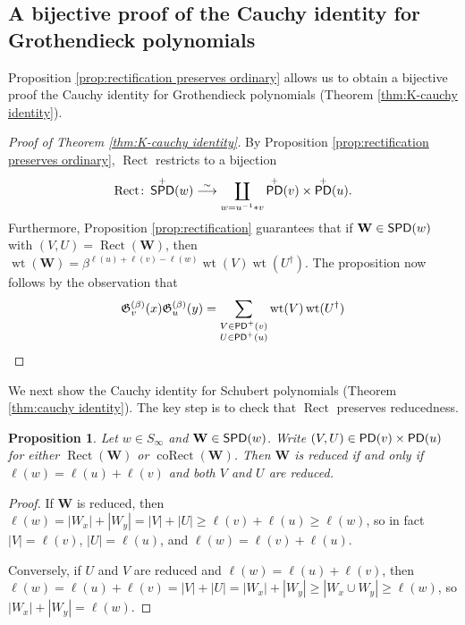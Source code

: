 \documentclass[11pt,reqno]{amsart} %
\newcommand{\frakG}{\mathfrak{G}}
\newcommand{\bfW}{\mathbf{W}}
\DeclareMathOperator{\wt}{wt}
\DeclareMathOperator{\PD}{\sf{PD}}
\DeclareMathOperator{\SPD}{\sf{SPD}}
\DeclareMathOperator{\Rect}{Rect} %
\DeclareMathOperator{\coRect}{coRect} %
\newtheorem{proposition}[theorem]{Proposition}
\theoremstyle{definition}
\begin{document}
\subsection{A bijective proof of the Cauchy identity for Grothendieck polynomials}
\label{subsect:cauchy identities}

Proposition \ref{prop:rectification preserves ordinary} allows us to obtain a bijective proof the Cauchy identity for Grothendieck polynomials (Theorem \ref{thm:K-cauchy identity}).

\begin{proof}[Proof of Theorem \ref{thm:K-cauchy identity}]
By Proposition \ref{prop:rectification preserves ordinary}, $\Rect$ restricts to a bijection
\[
    \Rect\colon \SPD^+(w)
    \overset\sim\longrightarrow
    \coprod_{
        w = u^{-1} * v
    } \PD^+(v) \times \PD^+(u).
\]
Furthermore, Proposition \ref{prop:rectification} guarantees that if $\bfW\in \SPD(w)$ with $(V,U) = \Rect(\bfW)$, then $\wt(\bfW) = \beta^{\ell(u)+\ell(v)-\ell(w)}\wt(V)\wt(U^\dagger)$.
The proposition now follows by the observation that \[
    \frakG^{(\beta)}_v(x)\frakG^{(\beta)}_u(y)
    = \sum_{\substack{
        V\in \PD^+(v) \\
        U\in \PD^+(u)
    }} \wt(V)\wt(U^\dagger) \qedhere
\]
\end{proof}

We next show the Cauchy identity for Schubert polynomials (Theorem \ref{thm:cauchy identity}).
The key step is to check that $\Rect$ preserves reducedness.

\begin{proposition}
\label{prop:rectification preserves reducedness}
Let $w\in S_\infty$ and $\bfW\in \SPD(w)$.
Write $(V,U)\in \PD(v)\times \PD(u)$ for either $\Rect(\bfW)$ or $\coRect(\bfW)$.
Then $\bfW$ is reduced if and only if $\ell(w) = \ell(u) + \ell(v)$ and both $V$ and $U$ are reduced.
\end{proposition}

\begin{proof}
If $\bfW$ is reduced, then $\ell(w) = |W_x| + |W_y| = |V| + |U| \geq \ell(v) + \ell(u) \geq \ell(w)$, so in fact $|V| = \ell(v)$, $|U| = \ell(u)$, and $\ell(w) = \ell(v) + \ell(u)$.

Conversely, if $U$ and $V$ are reduced and $\ell(w) = \ell(u) + \ell(v)$, then $\ell(w) = \ell(u) + \ell(v) = |V| + |U| = |W_x| + |W_y| \geq |W_x\cup W_y| \geq \ell(w)$, so $|W_x| + |W_y| = \ell(w)$.
\end{proof}
\end{document}
